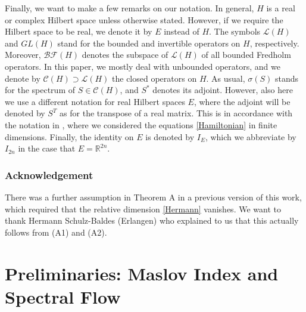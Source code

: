 \documentclass[a4paper,10pt]{article}
\begin{document}
Finally, we want to make a few remarks on our notation. In general, $H$ is a real or complex Hilbert space unless otherwise stated. However, if we require the Hilbert space to be real, we denote it by $E$ instead of $H$. The symbols $\mathcal{L}(H)$ and $GL(H)$ stand for the bounded and invertible operators on $H$, respectively. Moreover, $\mathcal{BF}(H)$ denotes the subspace of $\mathcal{L}(H)$ of all bounded Fredholm operators. In this paper, we mostly deal with unbounded operators, and we denote by $\mathcal{C}(H)\supset\mathcal{L}(H)$ the closed operators on $H$. As usual, $\sigma(S)$ stands for the spectrum of $S\in\mathcal{C}(H)$, and $S^\ast$ denotes its adjoint. However, also here we use a different notation for real Hilbert spaces $E$, where the adjoint will be denoted by $S^T$ as for the transpose of a real matrix. This is in accordance with the notation in \cite{WaterstraatHomoclinics}, where we considered the equations \eqref{Hamiltonian} in finite dimensions. Finally, the identity on $E$ is denoted by $I_E$, which we abbreviate by $I_{2n}$ in the case that $E=\mathbb{R}^{2n}$.   

\subsubsection*{Acknowledgement}
\vspace*{-0.2cm}
There was a further assumption in Theorem A in a previous version of this work, which required that the relative dimension \eqref{Hermann} vanishes. We want to thank Hermann Schulz-Baldes (Erlangen) who explained to us that this actually follows from (A1) and (A2). 




\section{Preliminaries: Maslov Index and Spectral Flow}
\end{document}
